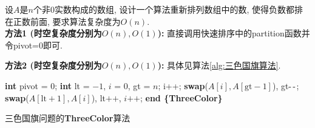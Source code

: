 \documentclass{article}
\begin{document}
\pagebreak

\begin{homeworkProblem}
	设$A$是$n$个非0实数构成的数组, 设计一个算法重新排列数组中的数, 使得负数都排在正数前面, 要求算法复杂度为$O(n)$.
	\\

	\solution \textbf{方法1 (时空复杂度分别为$O(n),O(1)$):} 直接调用快速排序中的partition函数并令pivot=0即可.

	\textbf{方法2 (时空复杂度分别为$O(n),O(1)$):} 具体见算法\ref{alg:三色国旗算法}.

\begin{algorithm}[H]
	\begin{algorithmic}[1]
	\State \textbf{int} pivot = 0;
	\State \textbf{int} lt = $-1$, $i$ = 0, gt = $n$;
			\State i++;
			\State \textbf{swap}($A[i],A[\text{gt}-1]$), gt$\text{-\,-}$;
			\State \textbf{swap}($A[\text{lt}+1],A[i]$), lt$\text{++}$, $i\text{++}$;
		\EndIf
	\EndWhile
	\State \textbf{end \{ThreeColor\}}
	\end{algorithmic}
	\caption{三色国旗问题的\textbf{ThreeColor}算法}
	\label{alg:三色国旗算法}
\end{algorithm}

\end{homeworkProblem}
\end{document}
